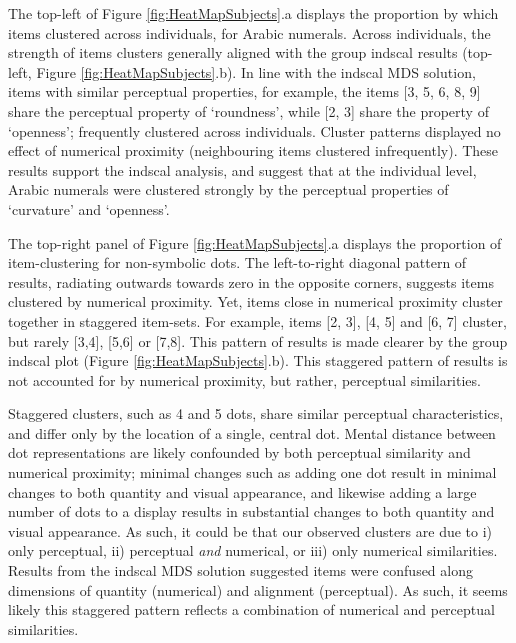 The top-left of Figure \ref{fig:HeatMapSubjects}.a displays the proportion by which items clustered across individuals, for Arabic numerals. Across individuals, the strength of items clusters generally aligned with the group indscal results (top-left, Figure \ref{fig:HeatMapSubjects}.b). In line with the indscal MDS solution, items with similar perceptual properties, for example, the items [3, 5, 6, 8, 9] share the perceptual property of `roundness', while [2, 3] share the property of `openness'; frequently clustered across individuals. Cluster patterns displayed no effect of numerical proximity (neighbouring items clustered infrequently). These results support the indscal analysis, and suggest that at the individual level, Arabic numerals were clustered strongly by the perceptual properties of `curvature' and `openness'. 

The top-right panel of Figure \ref{fig:HeatMapSubjects}.a displays the proportion of item-clustering for non-symbolic dots. The left-to-right diagonal pattern of results, radiating outwards towards zero in the opposite corners, suggests items clustered by numerical proximity. Yet, items close in numerical proximity cluster together in staggered item-sets. For example, items [2, 3], [4, 5] and [6, 7] cluster, but rarely [3,4], [5,6] or [7,8]. This pattern of results is made clearer by the group indscal plot (Figure \ref{fig:HeatMapSubjects}.b). This staggered pattern of results is not accounted for by numerical proximity, but rather, perceptual similarities. 

Staggered clusters, such as 4 and 5 dots, share similar perceptual characteristics, and differ only by the location of a single, central dot. Mental distance between dot representations are likely confounded by both perceptual similarity and numerical proximity; minimal changes such as adding one dot result in minimal changes to both quantity and visual appearance, and likewise adding a large number of dots to a display results in substantial changes to both quantity and visual appearance. As such, it could be that our observed clusters are due to i) only perceptual, ii) perceptual \textit{and} numerical, or iii) only numerical similarities. Results from the indscal MDS solution suggested items were confused along dimensions of quantity (numerical) and alignment (perceptual). As such, it seems likely this staggered pattern reflects a combination of numerical and perceptual similarities.

